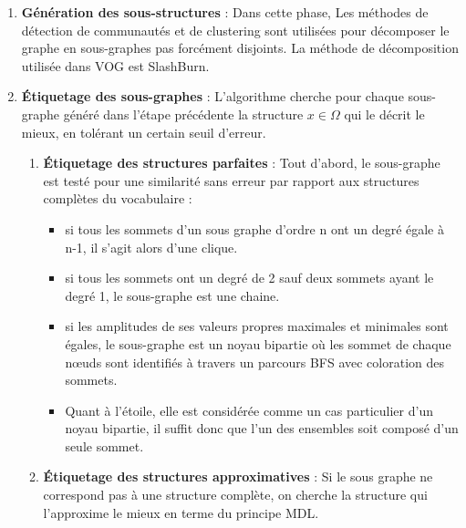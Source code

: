 \begin{enumerate}
 \item \textbf{Génération des sous-structures }: Dans cette phase, Les méthodes de détection de communautés et de clustering sont utilisées pour décomposer le graphe en sous-graphes pas forcément disjoints. La méthode de décomposition utilisée dans VOG est SlashBurn.  
 \item \textbf{Étiquetage des sous-graphes }: L'algorithme cherche pour chaque sous-graphe généré dans l'étape précédente la structure $x \in \Omega$ qui le décrit le mieux, en tolérant un certain seuil d'erreur.
  \begin{enumerate}[label=\alph*]
     \item \textbf{Étiquetage des structures parfaites} : Tout d'abord, le sous-graphe est testé pour une similarité sans erreur par rapport aux structures complètes du vocabulaire :
\begin{itemize}[label=$\circ$]
	\item si tous les sommets d'un sous graphe d'ordre n ont un degré égale à n-1, il s'agit alors d'une clique.
	\item si tous les sommets ont un degré de 2 sauf deux sommets ayant le degré 1, le  sous-graphe est une chaine.
	\item si les amplitudes de ses valeurs propres maximales et minimales sont égales, le sous-graphe est un noyau bipartie où les sommet de chaque nœuds sont identifiés à travers un parcours BFS avec coloration des sommets.
	\item  Quant à l'étoile, elle est considérée comme un cas particulier d'un noyau bipartie, il suffit donc que l'un des ensembles soit composé d'un seule sommet.
\end{itemize}     
     \item \textbf{Étiquetage des structures approximatives }: Si le sous graphe ne correspond pas à une structure complète, on cherche la structure qui l'approxime le mieux en terme du principe MDL.
     
  \end{enumerate} 
  

\end{enumerate}
